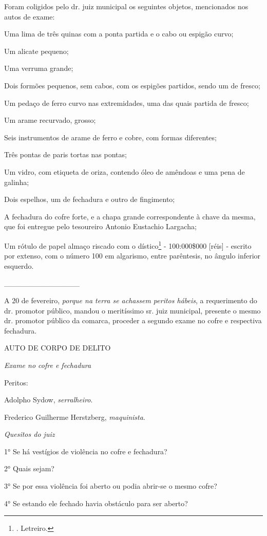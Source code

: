 Foram coligidos pelo dr. juiz municipal os seguintes objetos,
mencionados nos autos de exame:

Uma lima de três quinas com a ponta partida e o cabo ou espigão curvo;

Um alicate pequeno;

Uma verruma grande;

Dois formões pequenos, sem cabos, com os espigões partidos, sendo um de
fresco;

Um pedaço de ferro curvo nas extremidades, uma das quais partida de
fresco;

Um arame recurvado, grosso;

Seis instrumentos de arame de ferro e cobre, com formas diferentes;

Três pontas de paris tortas nas pontas;

Um vidro, com etiqueta de oriza, contendo óleo de amêndoas e uma pena de
galinha;

Dois espelhos, um de fechadura e outro de fingimento;

A fechadura do cofre forte, e a chapa grande correspondente à chave da
mesma, que foi entregue pelo tesoureiro Antonio Eustachio Largacha;

Um rótulo de papel almaço riscado com o dístico\footnote{. Letreiro.} -
100:000\$000 {[}réis{]} - escrito por extenso, com o número 100 em
algarismo, entre parêntesis, no ângulo inferior esquerdo.

\_\_\_\_\_\_\_\_\_\_\_\_\_\_

A 20 de fevereiro, \emph{porque na terra se achassem peritos hábeis}, a
requerimento do dr. promotor público, mandou o meritíssimo sr. juiz
municipal, presente o mesmo dr. promotor público da comarca, proceder a
segundo exame no cofre e respectiva fechadura.

AUTO DE CORPO DE DELITO

\emph{Exame no cofre e fechadura}

Peritos:

Adolpho Sydow, \emph{serralheiro}.

Frederico Guilherme Herstzberg, \emph{maquinista}.

\emph{Quesitos do juiz}

1° Se há vestígios de violência no cofre e fechadura?

2° Quais sejam?

3° Se por essa violência foi aberto ou podia abrir-se o mesmo cofre?

4° Se estando ele fechado havia obstáculo para ser aberto?

